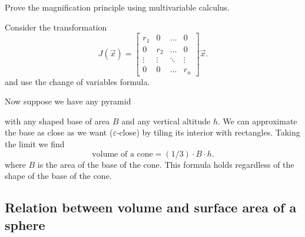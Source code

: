 \documentclass[hints,handout,noauthor,nooutcomes,12pt]{ximera}
\begin{document}
\begin{problem}
Prove the magnification principle using multivariable calculus.

\begin{hint}
Consider the transformation%
\[
J(\vec x)=
\begin{bmatrix}
r_{1} & 0   & \dots & 0\\
0     & r_2 & \dots & 0\\
\vdots &\vdots &\ddots & \vdots \\
0     & 0   & \dots & r_{n}%
\end{bmatrix}\vec x.
\]
and use the change of variables formula.
\end{hint}
\end{problem}

Now suppose we have any pyramid%
\begin{image}
\end{image}
with any shaped base of area $B$ and any vertical altitude $h$. We can
approximate the base as close as we want ($\varepsilon$-close) by
tiling its interior with rectangles. Taking the limit we find 
\[
\text{volume of a cone} =\left(  1/3\right)  \cdot B\cdot h.
\]
where $B$ is the area of the base of the cone. This formula holds regardless of the shape of the base of the cone.








\subsection{Relation between volume and surface area of a sphere}
\end{document}
